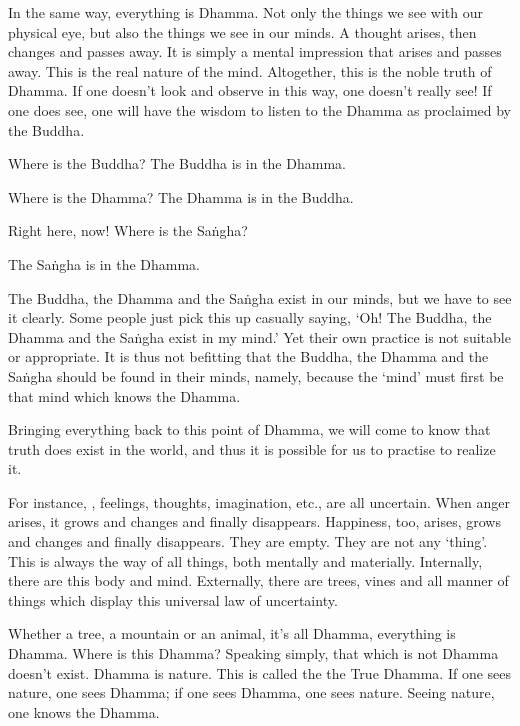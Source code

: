 In the same way, everything is Dhamma. Not only the things we see with our physical eye, but also the things we see in our minds. A thought arises, then changes and passes away. It is  simply a mental impression that arises and passes away. This is the real nature of the mind. Altogether, this is the noble truth of Dhamma. If one doesn't look and observe in this way, one doesn't really see! If one does see, one will have the wisdom to listen to the Dhamma as proclaimed by the Buddha.

Where is the Buddha? The Buddha is in the Dhamma.

Where is the Dhamma? The Dhamma is in the Buddha.

Right here, now! Where is the Sa\.ngha?

The Sa\.ngha is in the Dhamma.

The Buddha, the Dhamma and the Sa\.ngha exist in our minds, but we have to see it clearly. Some people just pick this up casually saying, `Oh! The Buddha, the Dhamma and the Sa\.ngha exist in my mind.' Yet their own practice is not suitable or appropriate. It is thus not befitting that the Buddha, the Dhamma and the Sa\.ngha should be found in their minds, namely, because the `mind' must first be that mind which knows the Dhamma.

Bringing everything back to this point of Dhamma, we will come to know that truth does exist in the world, and thus it is possible for us to practise to realize it.

For instance, , feelings, thoughts, imagination, etc., are all uncertain. When anger arises, it grows and changes and finally disappears. Happiness, too, arises, grows and changes and finally disappears. They are empty. They are not any `thing'. This is always the way of all things, both mentally and materially. Internally, there are this body and mind. Externally, there are trees, vines and all manner of things which display this universal law of uncertainty.

Whether a tree, a mountain or an animal, it's all Dhamma, everything is Dhamma. Where is this Dhamma? Speaking simply, that which is not Dhamma doesn't exist. Dhamma is nature. This is called the  the True Dhamma. If one sees nature, one sees Dhamma; if one sees Dhamma, one sees nature. Seeing nature, one knows the Dhamma.

